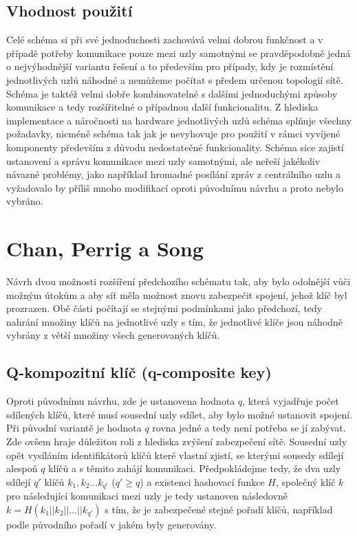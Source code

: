 \documentclass[11pt,final,twoside]{fithesis2}
\begin{document}
\subsection{Vhodnost použití}
Celé schéma si při své jednoduchosti zachovává velmi dobrou funkčnost a v případě potřeby komunikace pouze mezi uzly samotnými se pravděpodobně jedná o nejvýhodnější
variantu řešení a to především pro případy, kdy je rozmístění jednotlivých uzlů náhodné a nemůžeme počítat s předem určenou topologií sítě. Schéma je taktéž velmi dobře kombinovatelné
s dalšími jednoduchými způsoby komunikace a tedy rozšířitelné o případnou další funkcionalitu. Z hlediska implementace a náročnosti na hardware jednotlivých uzlů schéma
splňuje všechny požadavky, nicméně schéma tak jak je nevyhovuje pro použití v rámci vyvíjené komponenty především z důvodu nedostatečné funkcionality. Schéma sice zajistí ustanovení
a správu komunikace mezi uzly samotnými, ale neřeší jakékoliv návazné problémy, jako například hromadné posílání zpráv z centrálního uzlu a vyžadovalo by příliš mnoho modifikací oproti 
původnímu návrhu a proto nebylo vybráno.

\section{Chan, Perrig a Song} \label{sec:Chan}
Návrh dvou možnosti rozšíření \cite{Perrig2003} předchozího schématu \cite{Eschenauer2002} tak, aby bylo odolnější vůči možným útokům a aby síť měla možnost znovu zabezpečit spojení, jehož
klíč byl prozrazen. Obě části počítají se stejnými podmínkami jako předchozí, tedy nahrání množiny klíčů na jednotlivé uzly s tím, že jednotlivé klíče jsou náhodně vybrány 
z větší množiny všech generovaných klíčů.

\subsection{Q-kompozitní klíč (q-composite key)}
Oproti původnímu návrhu, zde je ustanovena hodnota $q$, která vyjadřuje počet sdílených klíčů, které musí sousední uzly sdílet, aby bylo možné ustanovit spojení. Při původní variantě 
je hodnota $q$ rovna jedné a tedy není potřeba se jí zabývat. Zde ovšem hraje důležitou roli z hlediska zvýšení zabezpečení sítě. Sousední uzly opět vysíláním identifikátorů klíčů které vlastní
zjistí, se kterými sousedy sdílejí alespoň $q$ klíčů a s těmito zahájí komunikaci. Předpokládejme tedy, že dva uzly sdílejí $q'$ klíčů $k_1, k_2 \dots k_{q'}$ ($q' \ge q$) a existenci hashovací funkce $H$, 
společný klíč $k$ pro následující komunikaci mezi uzly je tedy ustanoven následovně $k=H(k_1 || k_2 || \dots || k_{q'})$ s tím, že je zabezpečené stejné pořadí klíčů, například podle původního
pořadí v jakém byly generovány. 
\end{document}
